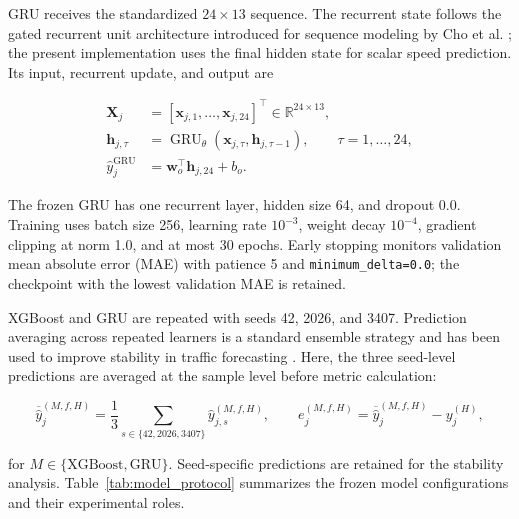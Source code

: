 \documentclass[pdflatex,sn-basic,Numbered]{sn-jnl}
\begin{document}
GRU receives the standardized $24\times13$ sequence. The recurrent state follows the gated recurrent unit architecture introduced for sequence modeling by Cho et al. \cite{Cho2014GRU}; the present implementation uses the final hidden state for scalar speed prediction. Its input, recurrent update, and output are

\begin{equation}
\begin{aligned}
\mathbf{X}_{j}&=[\mathbf{x}_{j,1},\ldots,\mathbf{x}_{j,24}]^{\top}\in\mathbb{R}^{24\times13},\\
\mathbf{h}_{j,\tau}&=\operatorname{GRU}_{\theta}(\mathbf{x}_{j,\tau},\mathbf{h}_{j,\tau-1}),\qquad \tau=1,\ldots,24,\\
\widehat{y}_{j}^{\mathrm{GRU}}&=\mathbf{w}_{o}^{\top}\mathbf{h}_{j,24}+b_o.
\end{aligned}
\label{eq:gru_model}
\end{equation}

The frozen GRU has one recurrent layer, hidden size 64, and dropout 0.0. Training uses batch size 256, learning rate $10^{-3}$, weight decay $10^{-4}$, gradient clipping at norm 1.0, and at most 30 epochs. Early stopping monitors validation mean absolute error (MAE) with patience 5 and \texttt{minimum\_delta=0.0}; the checkpoint with the lowest validation MAE is retained.

XGBoost and GRU are repeated with seeds 42, 2026, and 3407. Prediction averaging across repeated learners is a standard ensemble strategy and has been used to improve stability in traffic forecasting \cite{Cini2024DeepEnsemble}. Here, the three seed-level predictions are averaged at the sample level before metric calculation:

\begin{equation}
\overline{\widehat{y}}_{j}^{(M,f,H)}=\frac{1}{3}\sum_{s\in\{42,2026,3407\}}\widehat{y}_{j,s}^{(M,f,H)},
\qquad
e_j^{(M,f,H)}=\overline{\widehat{y}}_{j}^{(M,f,H)}-y_j^{(H)},
\label{eq:seed_ensemble}
\end{equation}

for $M\in\{\mathrm{XGBoost},\mathrm{GRU}\}$. Seed-specific predictions are retained for the stability analysis. Table~\ref{tab:model_protocol} summarizes the frozen model configurations and their experimental roles.
\end{document}

